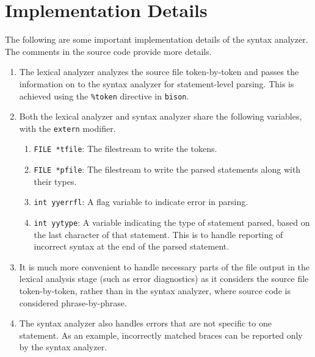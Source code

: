 \documentclass[journal,12pt,twocolumn]{IEEEtran}
\begin{document}
\section{Implementation Details}
The following are some important implementation details of the syntax analyzer.
The comments in the source code provide more details.
\begin{enumerate}
    \item The lexical analyzer analyzes the source file token-by-token and
    passes the information on to the syntax analyzer for statement-level
    parsing. This is achieved using the \texttt{\%token} directive in
    \texttt{bison}.
    \item Both the lexical analyzer and syntax analyzer share the following
    variables, with the \texttt{extern} modifier.
    \begin{enumerate}
        \item \texttt{FILE *tfile}: The filestream to write the tokens.
        \item \texttt{FILE *pfile}: The filestream to write the parsed
        statements along with their types.
        \item \texttt{int yyerrfl}: A flag variable to indicate error in
        parsing.
        \item \texttt{int yytype}: A variable indicating the type of statement
        parsed, based on the last character of that statement. This is to handle
        reporting of incorrect syntax at the end of the parsed statement.
    \end{enumerate}
    \item It is much more convenient to handle necessary parts of the file
    output in the lexical analysis stage (such as error diagnostics) as it
    considers the source file token-by-token, rather than in the syntax
    analyzer, where source code is considered phrase-by-phrase.
    \item The syntax analyzer also handles errors that are not specific to one
    statement. As an example, incorrectly matched braces can be reported only by
    the syntax analyzer.
\end{enumerate}
\end{document}
